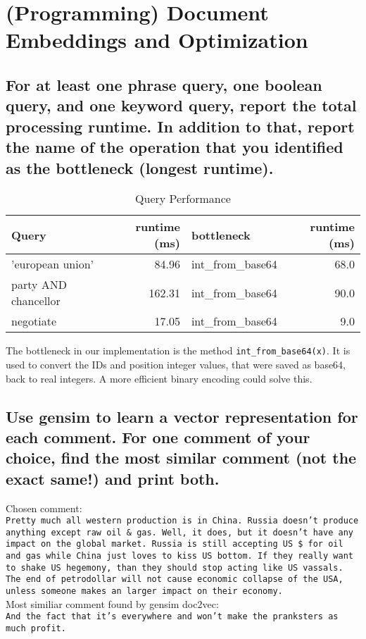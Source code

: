 \documentclass{scrartcl}
\begin{document}
\section{(Programming) Document Embeddings and Optimization}

\subsection{For at least one phrase query, one boolean query, and one keyword query, report the total processing runtime. In addition to that, report the name of the operation that you identified as the bottleneck (longest runtime).}

\begin{table}[h]
	\centering
	\caption{Query Performance}
	\begin{tabular}{l|r|l|r}
		Query                & runtime (ms) & bottleneck         & runtime (ms)  \\ \hline
		'european union'     &        84.96 & int\_from\_base64  & 68.0  \\
		party AND chancellor &       162.31 & int\_from\_base64  & 90.0  \\
		negotiate            &        17.05 & int\_from\_base64  &  9.0  \\
	\end{tabular}
\end{table}

The bottleneck in our implementation is the method \texttt{int\_from\_base64(x)}. It is used to convert the IDs and position integer values, that were saved as base64, back to real integers. A more efficient binary encoding could solve this.

\subsection{Use gensim to learn a vector representation for each comment. For one comment of your choice, find the most similar comment (not the exact same!) and print both.}

Chosen comment:\\

\texttt{Pretty much all western production is in China. Russia doesn't produce anything except raw oil \& gas. Well, it does, but it doesn't have any impact on the global market. Russia is still accepting US \$ for oil and gas while China just loves to kiss US bottom. If they really want to shake US hegemony, than they should stop acting like US vassals. The end of petrodollar will not cause economic collapse of the USA, unless someone makes an larger impact on their economy.}\\

Most similiar comment found by gensim doc2vec:\\

\texttt{And the fact that it's everywhere and won't make the pranksters as much profit.}
\end{document}
